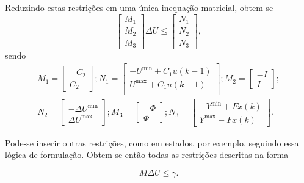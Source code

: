 Reduzindo estas restrições em uma única inequação matricial, obtem-se
%
\begin{equation}
	\label{eq:generic-restriction-matrix}
	\begin{bmatrix}
		M_1 \\
		M_2 \\
		M_3
	\end{bmatrix} \Delta{}U \le
	\begin{bmatrix}
		N_1 \\
		N_2 \\
		N_3
	\end{bmatrix},
\end{equation}
%
sendo
%
\begin{equation*}
	\begin{split}
		M_1 =
		\begin{bmatrix}
			-C_2 \\
			C_2
		\end{bmatrix};
		N_1 =
		\begin{bmatrix}
			-U^{\min} + C_1u(k-1) \\
			U^{\max} + C_1u(k-1)  \\
		\end{bmatrix};
		M_2 =
		\begin{bmatrix}
			-I \\
			I
		\end{bmatrix}; \\
		N_2 =
		\begin{bmatrix}
			-\Delta{}U^{\min} \\
			\Delta{}U^{\max}
		\end{bmatrix};
		M_3 =
		\begin{bmatrix}
			-\Phi \\
			\Phi
		\end{bmatrix};
		N_3 =
		\begin{bmatrix}
			-Y^{\min} + Fx(k) \\
			Y^{\max} - Fx(k)
		\end{bmatrix}.
	\end{split}
\end{equation*}

Pode-se inserir outras restrições, como em estados, por exemplo, seguindo essa
lógica de formulação. Obtem-se então todas as restrições descritas na forma

\begin{equation}
	\label{eq:generic-restriction-formulation}
	M\Delta{}U \le \gamma.
\end{equation}


